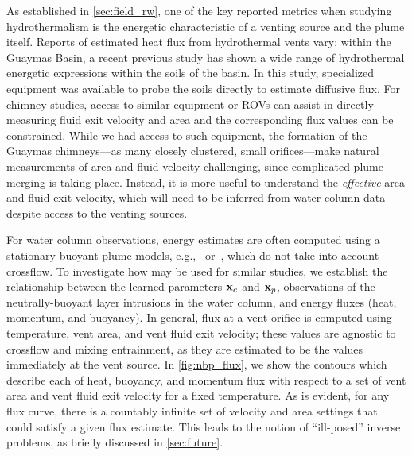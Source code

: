 As established in \cref{sec:field_rw}, one of the key reported metrics when studying hydrothermalism is the energetic characteristic of a venting source and the plume itself. Reports of estimated heat flux from hydrothermal vents vary; within the Guaymas Basin, a recent previous study has shown a wide range of hydrothermal energetic expressions within the soils of the basin\autocite{geilert2018formation}. In this study, specialized equipment was available to probe the soils directly to estimate diffusive flux. For chimney studies, access to similar equipment or ROVs can assist in directly measuring fluid exit velocity and area and the corresponding flux values can be constrained. While we had access to such equipment, the formation of the Guaymas chimneys---as many closely clustered, small orifices---make natural measurements of area and fluid velocity challenging, since complicated plume merging is taking place. Instead, it is more useful to understand the \emph{effective} area and fluid exit velocity, which will need to be inferred from water column data despite access to the venting sources. 

For water column observations, energy estimates are often computed using a stationary buoyant plume models, e.g.,~\cite{morton1956turbulent} or~\cite{speer1989model}, which do not take into account crossflow. To investigate how \PHUMES may be used for similar studies, we establish the relationship between the learned parameters $\mathbf{x}_c$ and $\mathbf{x}_p$, observations of the neutrally-buoyant layer intrusions in the water column, and energy fluxes (heat, momentum, and buoyancy). In general, flux at a vent orifice is computed using temperature, vent area, and vent fluid exit velocity; these values are agnostic to crossflow and mixing entrainment, as they are estimated to be the values immediately at the vent source. In \cref{fig:nbp_flux}, we show the contours which describe each of heat, buoyancy, and momentum flux with respect to a set of vent area and vent fluid exit velocity for a fixed temperature. As is evident, for any flux curve, there is a countably infinite set of velocity and area settings that could satisfy a given flux estimate. This leads to the notion of ``ill-posed'' inverse problems, as briefly discussed in \cref{sec:future}.

